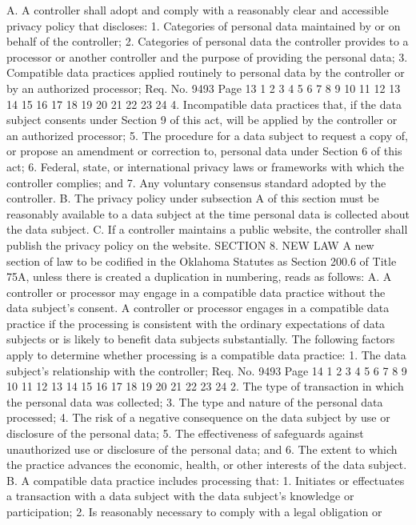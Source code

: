 A. A controller shall adopt and comply with a reasonably clear
and accessible privacy policy that discloses:
1. Categories of personal data maintained by or on behalf of
the controller;
2. Categories of personal data the controller provides to a
processor or another controller and the purpose of providing the
personal data;
3. Compatible data practices applied routinely to personal data
by the controller or by an authorized processor;
Req. No. 9493 Page 13
1
2
3
4
5
6
7
8
9
10
11
12
13
14
15
16
17
18
19
20
21
22
23
24
4. Incompatible data practices that, if the data subject
consents under Section 9 of this act, will be applied by the
controller or an authorized processor;
5. The procedure for a data subject to request a copy of, or
propose an amendment or correction to, personal data under Section 6
of this act;
6. Federal, state, or international privacy laws or frameworks
with which the controller complies; and
7. Any voluntary consensus standard adopted by the controller.
B. The privacy policy under subsection A of this section must
be reasonably available to a data subject at the time personal data
is collected about the data subject.
C. If a controller maintains a public website, the controller
shall publish the privacy policy on the website.
SECTION 8. NEW LAW A new section of law to be codified
in the Oklahoma Statutes as Section 200.6 of Title 75A, unless there
is created a duplication in numbering, reads as follows:
A. A controller or processor may engage in a compatible data
practice without the data subject's consent. A controller or
processor engages in a compatible data practice if the processing is
consistent with the ordinary expectations of data subjects or is
likely to benefit data subjects substantially. The following factors
apply to determine whether processing is a compatible data practice:
1. The data subject's relationship with the controller;
Req. No. 9493 Page 14
1
2
3
4
5
6
7
8
9
10
11
12
13
14
15
16
17
18
19
20
21
22
23
24
2. The type of transaction in which the personal data was
collected;
3. The type and nature of the personal data processed;
4. The risk of a negative consequence on the data subject by use
or disclosure of the personal data;
5. The effectiveness of safeguards against unauthorized use or
disclosure of the personal data; and
6. The extent to which the practice advances the economic,
health, or other interests of the data subject.
B. A compatible data practice includes processing that:
1. Initiates or effectuates a transaction with a data subject with
the data subject's knowledge or participation;
2. Is reasonably necessary to comply with a legal obligation or
